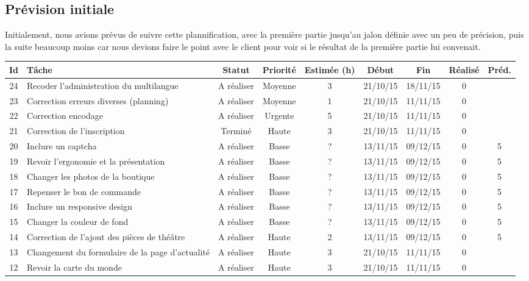 \documentclass[11pt]{report}
\begin{document}
\subsection{Prévision initiale}
Initialement, nous avions prévus de suivre cette plannification, avec la
première partie jusqu'au jalon définie avec un peu de précision, puis la suite
beaucoup moins car nous devions faire le point avec le client pour voir si le
résultat de la première partie lui convenait.
\par
\begin{tabular}{ | c | p{4cm} | c | c | c | c | c | c | c |  }
\hline 
Id & Tâche & Statut & Priorité & Estimée (h) & Début & Fin & Réalisé &
Préd. \\ \hline
24 & Recoder l'administration du multilangue & A réaliser & Moyenne & 3 &
	21/10/15 & 18/11/15 & 0 & \\ \hline
23 & Correction erreurs diverses (planning)
	& A réaliser & Moyenne & 1 & 21/10/15 & 11/11/15 & 0 & \\ \hline
22 & Correction encodage & A réaliser & Urgente & 5 & 21/10/15 & 11/11/15 & 0
	 & \\ \hline
21 & Correction de l'inscription & Terminé & Haute & 3 & 21/10/15 &
	11/11/15 & 0 & \\ \hline
20 & Inclure un captcha & A réaliser & Basse & ? & 13/11/15 &
	09/12/15 & 0 & 5 \\ \hline
19 & Revoir l'ergonomie et la présentation & A réaliser & Basse & ? & 13/11/15
	& 09/12/15 & 0 & 5 \\ \hline
18 & Changer les photos de la boutique & A réaliser & Basse & ? & 13/11/15 &
	09/12/15 & 0 & 5 \\ \hline
17 & Repenser le bon de commande & A réaliser & Basse & ? & 13/11/15 & 09/12/15
	& 0 & 5 \\ \hline
16 & Inclure un responsive design & A réaliser & Basse & ? &
	13/11/15 & 09/12/15 & 0 & 5 \\ \hline
15 & Changer la couleur de fond & A réaliser & Basse & ? & 13/11/15 & 09/12/15
	& 0 & 5  \\ \hline
14 & Correction de l'ajout des pièces de théâtre & A réaliser & Haute & 2 &
	13/11/15 & 09/12/15 & 0 & 5 \\ \hline
13 & Changement du formulaire de la page d'actualité & A réaliser & Haute & 3 &
	21/10/15 & 11/11/15 & 0 & \\ \hline
12 & Revoir la carte du monde & A réaliser & Haute & 3 & 21/10/15 & 11/11/15 & 0
	& \\ \hline

\end{tabular}
\end{document}
